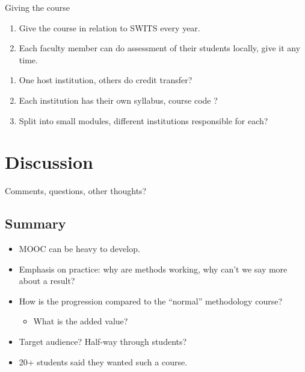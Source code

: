 \begin{frame}
  \begin{block}{Giving the course}
    \begin{enumerate}
      \item Give the course in relation to SWITS every year.
      \item Each faculty member can do assessment of their students locally, 
        \ie give it any time.
    \end{enumerate}
  \end{block}

  \pause

  \begin{remark}[Administration]
    \begin{enumerate}
      \item One host institution, others do credit transfer?
      \item Each institution has their own syllabus, course code \etc?
      \item Split into small modules, different institutions responsible for 
        each?
    \end{enumerate}
  \end{remark}
\end{frame}


\section{Discussion}

\begin{frame}
  \begin{center}
    Comments, questions, other thoughts?
  \end{center}
\end{frame}


\subsection{Summary}

\begin{frame}
  \begin{itemize}
    \item MOOC can be heavy to develop.
    \item Emphasis on practice: why are methods working, why can't we say more 
      about a result?
    \item How is the progression compared to the \enquote{normal} methodology  
      course?
      \begin{itemize}
        \item What is the added value?
      \end{itemize}
    \item Target audience? Half-way through students?
    \item 20+ students said they wanted such a course.
  \end{itemize}
\end{frame}



\begin{frame}[allowframebreaks]
  \printbibliography
\end{frame}

